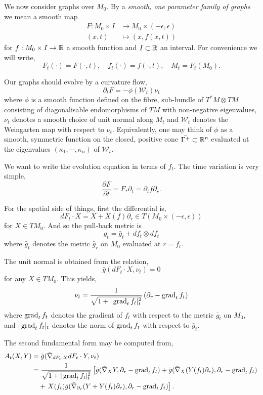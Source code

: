 \documentclass{amsart}
\begin{document}
We now consider graphs over \(M_0\). By a \emph{smooth, one parameter family of graphs} we mean a smooth map
\begin{align*}
F : M_0 \times I &\to M_0 \times (-\epsilon, \epsilon) \\
(x, t) &\mapsto (x, f(x, t))
\end{align*}
for \(f : M_0 \times I \to \mathbb{R}\) a smooth function and \(I \subset \mathbb{R}\) an interval. For convenience we will write,
\[
F_t (\cdot) = F(\cdot, t), \quad f_t(\cdot) = f(\cdot, t), \quad M_t = F_t(M_0).
\]

Our graphs should evolve by a curvature flow,
\[
\partial_t F = -\phi(\mathcal{W}_t) \nu_t
\]
where \(\phi\) is a smooth function defined on the fibre, sub-bundle of \(T^{\ast} M \otimes TM\) consisting of diagonalisable endomorphisms of \(TM\) with non-negative eigenvalues, \(\nu_t\) denotes a smooth choice of unit normal along \(M_t\) and \(\mathcal{W}_t\) denotes the Weingarten map with respect to \(\nu_t\). Equivalently, one may think of \(\phi\) as a smooth, symmetric function on the closed, positive cone \(\bar{\Gamma^+} \subset \mathbb{R}^n\) evaluated at the eigenvalues \((\kappa_1,\cdots, \kappa_n)\) of \(\mathcal{W}_t\).

We want to write the evolution equation in terms of \(f_t\). The time variation is very simple,
\[
\frac{\partial F}{\partial t} = F_{\ast} \partial_t = \partial_t f \partial_r.
\]

For the spatial side of things, first the differential is,
\[
dF_t \cdot X = X + X(f) \partial_r \in T(M_0 \times (-\epsilon, \epsilon))
\]
for \(X \in TM_0\). And so the pull-back metric is
\[
g_t = \bar{g}_t + df_t \otimes df_t
\]
where \(\bar{g}_t\) denotes the metric \(\bar{g}_r\) on \(M_0\) evaluated at \(r = f_t\).

The unit normal is obtained from the relation,
\[
\bar{g} (dF_t \cdot X, \nu_t) = 0
\]
for any \(X \in TM_0\). This yields,
\[
\nu_t = \frac{1}{\sqrt{1 + |\operatorname{grad}_t f_t|_t^2}} \left(\partial_r - \operatorname{grad}_t f_t\right)
\]
where \(\operatorname{grad}_t f_t\) denotes the gradient of \(f_t\) with respect to the metric \(\bar{g}_t\) on \(M_0\), and \(|\operatorname{grad}_t f_t|_t\) denotes the norm of \(\operatorname{grad}_t f_t\) with respect to \(\bar{g}_t\).

The second fundamental form may be computed from,
\begin{align*}
A_t (X, Y) &= \bar{g} (\bar{\nabla}_{dF_t \cdot X} dF_t \cdot Y, \nu_t) \\
&= \frac{1}{\sqrt{1 + |\operatorname{grad}_t f_t|_t^2}} \left[\bar{g}(\bar{\nabla}_X Y, \partial_r - \operatorname{grad}_t f_t) + \bar{g}(\bar{\nabla}_X (Y(f_t) \partial_r), \partial_r - \operatorname{grad}_t f_t)\right. \\
&\quad + \left.X(f_t) \bar{g} (\bar{\nabla}_{\partial_r} (Y + Y(f_t) \partial_r), \partial_r - \operatorname{grad}_t f_t)\right].
\end{align*}
\end{document}
